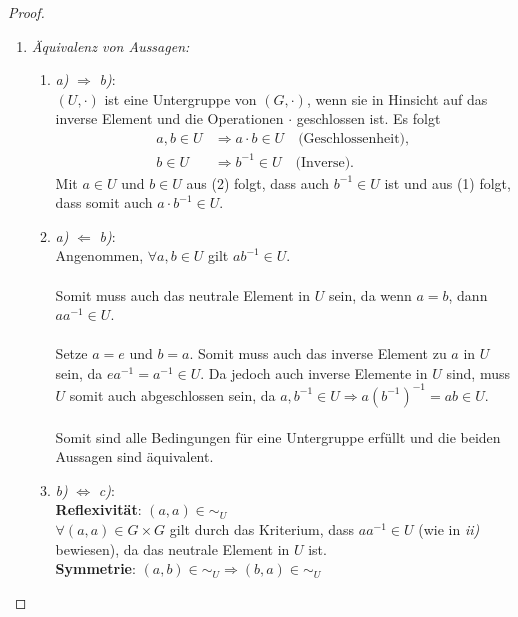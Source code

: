 \documentclass{../problemset}
\begin{document}
\begin{problem}
\begin{proof}
	\begin{enumerate}
		\item \textit{Äquivalenz von Aussagen:}
		      \begin{enumerate}[label=\alph*)]
			      \item \textit{a)} $\Longrightarrow$ \textit{b)}: \\
			            $(U, \cdot)$ ist eine Untergruppe von $(G, \cdot)$, wenn sie in Hinsicht auf das inverse Element und die Operationen $\cdot$ geschlossen ist.
			            Es folgt
			            \begin{align}
				            a, b \in U & \Longrightarrow a \cdot b \in U \quad \text{(Geschlossenheit)}, \\
				            b \in U    & \Longrightarrow b^{-1} \in U \quad \text{(Inverse)}.
			            \end{align}
			            Mit $a \in U$ und $b \in U$ aus (2) folgt, dass auch $b^{-1} \in U$ ist und aus (1) folgt, dass somit auch $a \cdot b^{-1} \in U$. \checkmark
			      \item \textit{a)} $\Longleftarrow$ \textit{b)}: \\
			            Angenommen, $\forall a,b \in U$ gilt $ab^{-1} \in U$. \\
			            \\
			            Somit muss auch das neutrale Element in $U$ sein, da wenn $a=b$, dann $aa^{-1} \in U$. \\
			            \\
			            Setze $a=e$ und $b=a$. Somit muss auch das inverse Element zu $a$ in $U$ sein, da $ea^{-1} = a^{-1} \in U$.
			            Da jedoch auch inverse Elemente in $U$ sind, muss $U$ somit auch abgeschlossen sein, da $a,b^{-1} \in U \Longrightarrow a{(b^{-1})}^{-1} = ab \in U$. \\
			            \\
			            Somit sind alle Bedingungen für eine Untergruppe erfüllt und die beiden Aussagen sind äquivalent. \checkmark
			      \item \textit{b)} $\Longleftrightarrow$ \textit{c)}: \\
			            \textbf{Reflexivität}: $(a, a) \in \sim_U$ \\
			            $\forall (a,a) \in G \times G$ gilt durch das Kriterium, dass $aa^{-1} \in U$ (wie in \textit{ii)} bewiesen), da das neutrale Element in $U$ ist. \checkmark \\
			            \textbf{Symmetrie}: $(a, b) \in \sim_U \Longrightarrow (b,a) \in \sim_U$ \\

\end{enumerate}
\end{enumerate}
\end{proof}
\end{problem}
\end{document}
